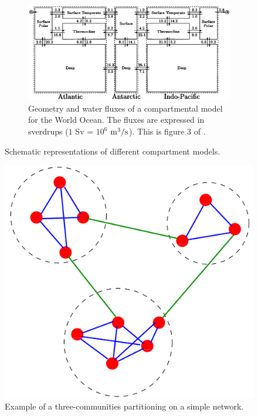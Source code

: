 \begin{figure}[!htp]
\begin{subfigure}[b]{\linewidth}
		\centering
		\includegraphics[width=\textwidth]{fig/intro/boxmodel_Munhoven.png}
		\caption{Geometry and water fluxes of a compartmental model for the World Ocean. The fluxes are expressed in sverdrups ($1$ Sv = $10^6$ $\rm{m^3/s}$). This is figure 3 of \cite{munhoven1996glacial}.}
	\end{subfigure}%
\caption{Schematic representations of different compartment models.}\label{fig:intro:boxmodels}
\end{figure}
\begin{figure}[!htp]
	\centering
	\includegraphics[width=.4\textwidth]{fig/intro/communities_example.png}
	\caption{Example of a three-communities partitioning on a simple network.} \label{fiug:intro:communities}
\end{figure}